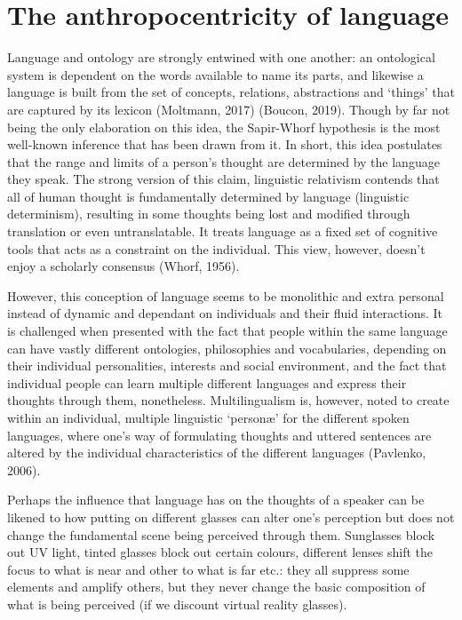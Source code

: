 \section{The anthropocentricity of language}

Language and ontology are strongly entwined with one another: an ontological system is dependent on the words available to name its parts, and likewise a language is built from the set of concepts, relations, abstractions and ‘things’ that are captured by its lexicon  (Moltmann, 2017) (Boucon, 2019). Though by far not being the only elaboration on this idea, the Sapir-Whorf hypothesis is the most well-known inference that has been drawn from it. In short, this idea postulates that the range and limits of a person’s thought are determined by the language they speak. The strong version of this claim, linguistic relativism contends that all of human thought is fundamentally determined by language (linguistic determinism), resulting in some thoughts being lost and modified through translation or even untranslatable. It treats language as a fixed set of cognitive tools that acts as a constraint on the individual. This view, however, doesn’t enjoy a scholarly consensus (Whorf, 1956).  

However, this conception of language seems to be monolithic and extra personal instead of dynamic and dependant on individuals and their fluid interactions. It is challenged when presented with the fact that people within the same language can have vastly different ontologies, philosophies and vocabularies, depending on their individual personalities, interests and social environment, and the fact that individual people can learn multiple different languages and express their thoughts through them, nonetheless. Multilingualism is, however, noted to create within an individual, multiple linguistic ‘personæ’ for the different spoken languages, where one’s way of formulating thoughts and uttered sentences are altered by the individual characteristics of the different languages  (Pavlenko, 2006). 

Perhaps the influence that language has on the thoughts of a speaker can be likened to how putting on different glasses can alter one’s perception but does not change the fundamental scene being perceived through them. Sunglasses block out UV light, tinted glasses block out certain colours, different lenses shift the focus to what is near and other to what is far etc.: they all suppress some elements and amplify others, but they never change the basic composition of what is being perceived (if we discount virtual reality glasses). 

